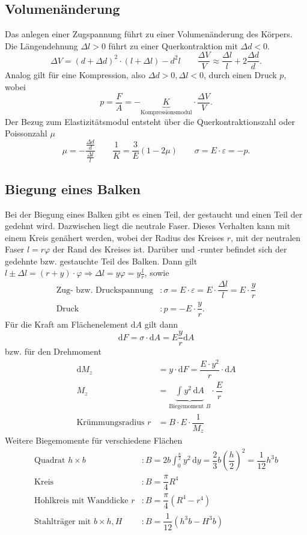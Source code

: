 \documentclass[a4paper,12pt]{article}
\newcommand{\td}{\,\text{d}}
\numberwithin{equation}{section}
\begin{document}
\subsection{Volumenänderung}
Das anlegen einer Zugspannung führt zu einer Volumenänderung des Körpers. Die Längendehnung $\Delta l>0$ führt zu einer Querkontraktion mit $\Delta d<0$.
\[ 
        \Delta V=\left(d+\Delta d\right)^2\cdot \left(l+\Delta l\right)-d^2l\qquad \dfrac{\Delta V}{V}\approx \dfrac{\Delta l}{l}+2\dfrac{\Delta d}{d}
.\] 
Analog gilt für eine Kompression, also $\Delta d>0,\Delta l<0$, durch einen Druck $p$, wobei 
\[ 
        p=\dfrac{F}{A}=-\underbrace{K}_{\text{Kompressionsmodul}}\cdot \dfrac{\Delta V}{V}
.\] 
Der Bezug zum Elastizitätsmodul entsteht über die Querkontraktionszahl oder Poissonzahl $\mu $ 
\[ 
        \mu =-\dfrac{\tfrac{\Delta d}{d}}{\tfrac{\Delta l}{l}}\qquad \dfrac{1}{K}=\dfrac{3}{E}\left(1-2\mu \right)\qquad \sigma =E\cdot \varepsilon=-p
.\] 

\subsection{Biegung eines Balken}
Bei der Biegung eines Balken gibt es einen Teil, der gestaucht und einen Teil der gedehnt wird. Dazwischen liegt die neutrale Faser. Dieses Verhalten kann mit einem Kreis genähert werden, wobei der Radius des Kreises $r$, mit der neutralen Faser $l=r\varphi $ der Rand des Kreises ist. Darüber und -runter befindet sich der gedehnte bzw. gestauchte Teil des Balken. Dann gilt $l\pm \Delta l=\left(r+y\right)\cdot \varphi \Rightarrow \Delta l=y\varphi =y\tfrac{l}{r}$, sowie
\begin{align*}
        \text{Zug- bzw. Druckspannung}&:\sigma =E\cdot \varepsilon =E\cdot \dfrac{\Delta l}{l}=E\cdot \dfrac{y}{r}\\
        \text{Druck}&:p=-E\cdot \dfrac{y}{r}
.\end{align*}
Für die Kraft am Flächenelement $\text{d}A$ gilt dann
\[ 
        \text{d}F=\sigma \cdot \text{d}A=E\dfrac{y}{r}\text{d}A
\]  
bzw. für den Drehmoment
\begin{align*}
        \text{d}M_z&=y\cdot \text{d}F=\dfrac{E\cdot y^2}{r}\cdot \text{d}A\\
        M_z&=\underbrace{\int_{}^{}y^2\td A}_{\text{Biegemoment }B}\cdot \dfrac{E}{r}\\
        \text{Krümmungsradius }r&=B\cdot E\cdot \dfrac{1}{M_z}
\end{align*} 
Weitere Biegemomente für verschiedene Flächen
\begin{align*}
        \text{Quadrat }h\times b&:B=2b\int_{0}^{\tfrac{h}{2}}y^2\td y=\dfrac{2}{3}b\left(\dfrac{h}{2}\right)^2=\dfrac{1}{12}h^3b\\
        \text{Kreis}&:B=\dfrac{\pi }{4}R^4\\
        \text{Hohlkreis mit Wanddicke }r&:B=\dfrac{\pi }{4}\left(R^4-r^4\right)\\
        \text{Stahlträger mit }b\times h,H&:B=\dfrac{1}{12}\left(h^3b-H^3b\right)
\end{align*}
\end{document}
